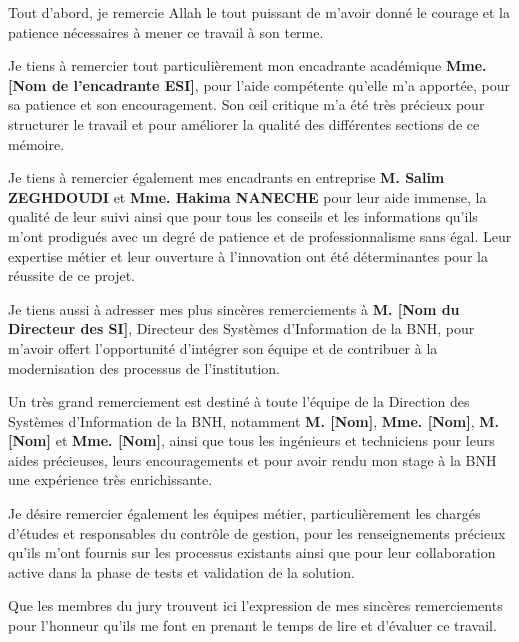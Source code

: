 
Tout d'abord, je remercie Allah le tout puissant de m'avoir donné le courage et la patience nécessaires à mener ce travail à son terme.

\medskip

Je tiens à remercier tout particulièrement mon encadrante académique \textbf{Mme. [Nom de l'encadrante ESI]}, pour l'aide compétente qu'elle m'a apportée, pour sa patience et son encouragement. Son œil critique m'a été très précieux pour structurer le travail et pour améliorer la qualité des différentes sections de ce mémoire.

\medskip

Je tiens à remercier également mes encadrants en entreprise \textbf{M. Salim ZEGHDOUDI} et \textbf{Mme. Hakima NANECHE} pour leur aide immense, la qualité de leur suivi ainsi que pour tous les conseils et les informations qu'ils m'ont prodigués avec un degré de patience et de professionnalisme sans égal. Leur expertise métier et leur ouverture à l'innovation ont été déterminantes pour la réussite de ce projet.

\medskip

Je tiens aussi à adresser mes plus sincères remerciements à \textbf{M. [Nom du Directeur des SI]}, Directeur des Systèmes d'Information de la BNH, pour m'avoir offert l'opportunité d'intégrer son équipe et de contribuer à la modernisation des processus de l'institution.

\medskip

Un très grand remerciement est destiné à toute l'équipe de la Direction des Systèmes d'Information de la BNH, notamment \textbf{M. [Nom]}, \textbf{Mme. [Nom]}, \textbf{M. [Nom]} et \textbf{Mme. [Nom]}, ainsi que tous les ingénieurs et techniciens pour leurs aides précieuses, leurs encouragements et pour avoir rendu mon stage à la BNH une expérience très enrichissante.

\medskip

Je désire remercier également les équipes métier, particulièrement les chargés d'études et responsables du contrôle de gestion, pour les renseignements précieux qu'ils m'ont fournis sur les processus existants ainsi que pour leur collaboration active dans la phase de tests et validation de la solution.

\medskip

Que les membres du jury trouvent ici l'expression de mes sincères remerciements pour l'honneur qu'ils me font en prenant le temps de lire et d'évaluer ce travail.

